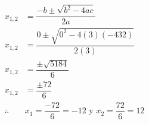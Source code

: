 \begin{solutionbox}{13cm}
\begin{multicols}{2}
\begin{align*}
            x_{1,2}    & = \dfrac{-b\pm\sqrt{b^2-4ac}}{2a}                         \\[2em]
            x_{1,2}    & = \dfrac{0\pm\sqrt{0^2-4(3)(-432)}}{2(3)}                 \\[2em]
            x_{1,2}    & = \dfrac{\pm\sqrt{5184}}{6}                               \\[2em]
            x_{1,2}    & = \dfrac{\pm72}{6}                                        \\[2em]
            \therefore & x_1 =\dfrac{-72}{6}=-12 \text{ y }  x_2 =\dfrac{72}{6}=12 \\[2em]
        \end{align*}
    \end{multicols}
\end{solutionbox}
